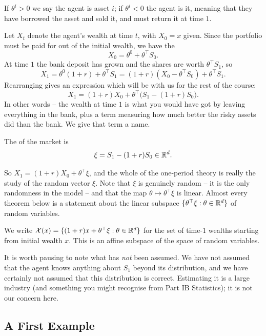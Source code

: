 \documentclass[a4paper]{scrartcl}
\begin{document}
If $\theta^i > 0$ we say the agent is  asset $i$; if $\theta^i < 0$ the agent is  it, meaning that they have borrowed the asset and sold it, and must return it at time $1$.

Let $X_t$ denote the agent's wealth at time $t$, with $X_0 = x$ given. Since the portfolio must be paid for out of the initial wealth, we have the 
$$
X_0 = \theta^0 + \theta^\top S_0.
$$
At time $1$ the bank deposit has grown and the shares are worth $\theta^\top S_1$, so
$$
X_1 = \theta^0(1+r) + \theta^\top S_1 = (1+r)\left(X_0 - \theta^\top S_0\right) + \theta^\top S_1.
$$
Rearranging gives an expression which will be with us for the rest of the course:
$$
\boxed{\;X_1 = (1+r)X_0 + \theta^\top\big(S_1 - (1+r)S_0\big).\;}
$$
In other words -- the wealth at time $1$ is what you would have got by leaving everything in the bank, plus a term measuring how much better the risky assets did than the bank. We give that term a name.

\begin{definition}
	The  of the market is
	$$
	\xi = S_1 - (1+r)S_0 \in \mathbb{R}^d.
	$$
\end{definition}

So $X_1 = (1+r)X_0 + \theta^\top \xi$, and the whole of the one-period theory is really the study of the random vector $\xi$. Note that $\xi$ is genuinely random -- it is the only randomness in the model -- and that the map $\theta \mapsto \theta^\top \xi$ is linear. Almost every theorem below is a statement about the linear subspace $\{\theta^\top \xi : \theta \in \mathbb{R}^d\}$ of random variables.

We write $\mathcal{X}(x) = \{(1+r)x + \theta^\top \xi : \theta \in \mathbb{R}^d\}$ for the set of  time-$1$ wealths starting from initial wealth $x$. This is an affine subspace of the space of random variables.

\begin{remark}
	It is worth pausing to note what has \emph{not} been assumed. We have not assumed that the agent knows anything about $S_1$ beyond its distribution, and we have certainly not assumed that this distribution is correct. Estimating it is a large industry (and something you might recognise from Part IB Statistics); it is not our concern here.
\end{remark}

\subsection{A First Example}
\end{document}
